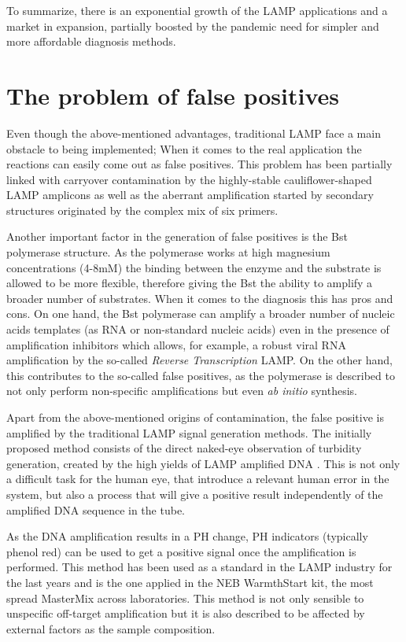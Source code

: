 To summarize, there is an exponential growth of the LAMP applications and a market in expansion, partially boosted by the pandemic need for simpler and more affordable diagnosis methods. 

\section{The problem of false positives}

Even though the above-mentioned advantages, traditional LAMP face a main obstacle to being implemented; When it comes to the real application the reactions can easily come out as false positives. This problem has been partially linked with carryover contamination by the highly-stable cauliflower-shaped LAMP amplicons\cite{gao_pullulan_2019} as well as the aberrant  amplification started by secondary structures originated by the complex mix of six primers. 

Another important factor in the generation of false positives is the Bst polymerase structure. As the polymerase works at high magnesium concentrations (4-8mM) the binding between the enzyme and the substrate is allowed to be more flexible, therefore giving the Bst the ability to amplify a broader number of substrates. When it comes to the diagnosis this has pros and cons. On one hand, the Bst polymerase can amplify a broader number of nucleic acids templates (as RNA or non-standard nucleic acids) even in the presence of amplification inhibitors\cite{glokler_isothermal_2021} which allows, for example, a robust viral RNA amplification by the so-called \emph{Reverse Transcription} LAMP. On the other hand, this contributes to the so-called false positives, as the polymerase is described to not only perform non-specific amplifications but even \emph{ab initio} synthesis\cite{zyrina_ab_2014}.

Apart from the above-mentioned origins of contamination, the false positive is amplified by the traditional LAMP signal generation methods. The initially proposed method consists of the direct naked-eye observation of turbidity generation, created by the high yields of LAMP amplified DNA \cite{notomi_loop-mediated_2000}. This is not only a difficult task for the human eye, that introduce a relevant human error in the system, but also a process that will give a positive result independently of the amplified DNA sequence in the tube.

As the DNA amplification results in a PH change, PH indicators (typically phenol red) can be used to get a positive signal once the amplification is performed. This method has been used as a standard in the LAMP industry for the last years and is the one applied in the NEB WarmthStart kit\cite{new_england_biolabs_warmstart_2022}, the most spread MasterMix across laboratories. This method is not only sensible to unspecific off-target amplification but it is also described to be affected by external factors as the sample composition\cite{uribe-alvarez_low_2021}.

